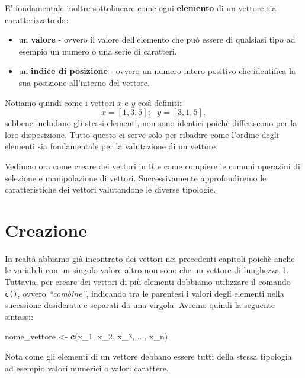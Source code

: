 \documentclass[
]{book}
\newenvironment{Shaded}{\begin{snugshade}}{\end{snugshade}}
\newcommand{\DecValTok}[1]{\textcolor[rgb]{0.00,0.00,0.81}{#1}}
\newcommand{\KeywordTok}[1]{\textcolor[rgb]{0.13,0.29,0.53}{\textbf{#1}}}
\newcommand{\NormalTok}[1]{#1}
\newcommand{\StringTok}[1]{\textcolor[rgb]{0.31,0.60,0.02}{#1}}
\providecommand{\tightlist}{%
  \setlength{\itemsep}{0pt}\setlength{\parskip}{0pt}}
\begin{document}
E' fondamentale inoltre sottolineare come ogni \textbf{elemento} di un vettore sia caratterizzato da:

\begin{itemize}
\tightlist
\item
  un \textbf{valore} - ovvero il valore dell'elemento che può essere di qualsiasi tipo ad esempio un numero o una serie di caratteri.
\item
  un \textbf{indice di posizione} - ovvero un numero intero positivo che identifica la sua posizione all'interno del vettore.
\end{itemize}

Notiamo quindi come i vettori \(x\) e \(y\) così definiti:
\[
x = [1, 3, 5];\ \ \ y = [3, 1, 5],
\]
sebbene includano gli stessi elementi, non sono identici poichè differiscono per la loro disposizione. Tutto questo ci serve solo per ribadire come l'ordine degli elementi sia fondamentale per la valutazione di un vettore.

Vedimao ora come creare dei vettori in R e come compiere le comuni operazini di selezione e manipolazione di vettori. Successivamente approfondiremo le caratteristiche dei vettori valutandone le diverse tipologie.

\hypertarget{creazione}{%
\section{Creazione}\label{creazione}}

In realtà abbiamo già incontrato dei vettori nei precedenti capitoli poichè anche le variabili con un singolo valore altro non sono che un vettore di lunghezza 1. Tuttavia, per creare dei vettori di più elementi dobbiamo utilizzare il comando \texttt{c()}, ovvero \emph{``combine''}, indicando tra le parentesi i valori degli elementi nella sucessione desiderata e separati da una virgola. Avremo quindi la seguente sintassi:

\begin{Shaded}
\begin{Highlighting}[]
\NormalTok{nome_vettore <-}\StringTok{ }\KeywordTok{c}\NormalTok{(x_}\DecValTok{1}\NormalTok{, x_}\DecValTok{2}\NormalTok{, x_}\DecValTok{3}\NormalTok{, ..., x_n)}
\end{Highlighting}
\end{Shaded}

Nota come gli elementi di un vettore debbano essere tutti della stessa tipologia ad esempio valori numerici o valori carattere.
\end{document}
